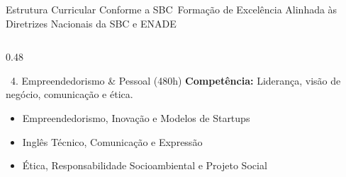 \begin{frame}{Estrutura Curricular Conforme a SBC}{\faCubes\ Formação de Excelência Alinhada às Diretrizes Nacionais da SBC e ENADE}
\begin{columns}[t]
\begin{column}{0.48\textwidth}
      \vspace{0.1cm}
      
      \begin{moderncard}{\faUserFriends\ 4. Empreendedorismo \& Pessoal (480h)}
        \tiny
        \textbf{Competência:} Liderança, visão de negócio, comunicação e ética.
        \begin{itemize}\setlength{\itemsep}{0.05em}
          \item Empreendedorismo, Inovação e Modelos de Startups
          \item Inglês Técnico, Comunicação e Expressão
          \item Ética, Responsabilidade Socioambiental e Projeto Social
        \end{itemize}
      \end{moderncard}
    \end{column}
  \end{columns}
\end{frame}

